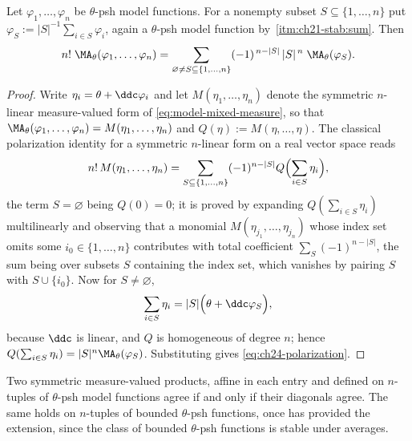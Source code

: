 \begin{proposition}
\label{prop:ch24-polarization}
Let $\varphi_1,\ldots,\varphi_n$ be $\theta$-psh model functions.  For a
nonempty subset $S\subseteq\{1,\ldots,n\}$ put
$\varphi_S:=|S|^{-1}\sum_{i\in S}\varphi_i$, again a $\theta$-psh model
function by \,\cref{itm:ch21-stab:sum}.  Then
\begin{equation}
\label{eq:ch24-polarization}
 n!\;\MA_\theta(\varphi_1,\ldots,\varphi_n)
 =\sum_{\varnothing\neq S\subseteq\{1,\ldots,n\}}
   (-1)^{\,n-|S|}\,|S|^{\,n}\;\MA_\theta(\varphi_S).
\end{equation}
\end{proposition}

\begin{proof}
Write $\eta_i=\theta+\ddc\varphi_i$ and let
$M(\eta_1,\ldots,\eta_n)$ denote the symmetric $n$-linear
measure-valued form of \eqref{eq:model-mixed-measure}, so that
$\MA_\theta(\varphi_1,\ldots,\varphi_n)=M(\eta_1,\ldots,\eta_n)$ and
$Q(\eta):=M(\eta,\ldots,\eta)$.  The classical polarization identity for a
symmetric $n$-linear form on a real vector space reads
\[
 n!\,M(\eta_1,\ldots,\eta_n)
 =\sum_{S\subseteq\{1,\ldots,n\}}(-1)^{n-|S|}
   Q\Bigl(\sum_{i\in S}\eta_i\Bigr),
\]
the term $S=\varnothing$ being $Q(0)=0$; it is proved by expanding
$Q(\sum_{i\in S}\eta_i)$ multilinearly and observing that a monomial
$M(\eta_{j_1},\ldots,\eta_{j_n})$ whose index set omits some
$i_0\in\{1,\ldots,n\}$ contributes with total coefficient
$\sum_{S}(-1)^{n-|S|}$, the sum being over subsets $S$ containing the
index set, which vanishes by pairing $S$ with $S\cup\{i_0\}$.  Now for
$S\neq\varnothing$,
\[
 \sum_{i\in S}\eta_i=|S|\Bigl(\theta+\ddc\varphi_S\Bigr),
\]
because $\ddc$ is linear, and $Q$ is homogeneous of degree $n$; hence
$Q(\sum_{i\in S}\eta_i)=|S|^n\MA_\theta(\varphi_S)$.  Substituting gives
\eqref{eq:ch24-polarization}.
\end{proof}

\begin{corollary}\label{cor:ch24-mixed-from-diagonal}
Two symmetric measure-valued products, affine in each entry and defined on
$n$-tuples of
$\theta$-psh model functions agree if and only if their diagonals agree.
The same holds on $n$-tuples of bounded $\theta$-psh functions, once
 has provided the extension, since the class
of bounded $\theta$-psh functions is stable under averages.
\end{corollary}

